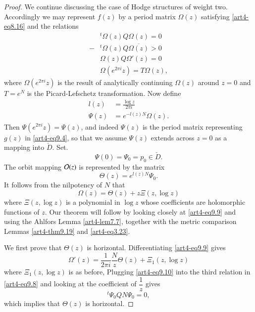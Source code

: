 \begin{proof}
We continue discussing the case of Hodge structures of weight two.  Accordingly we may represent $f(z)$ by a period matrix $\Omega(z)$ satisfying \eqref{art4-eq8.16} and the relations
\begin{align*}
&{}^t \Omega (z) Q \Omega (z) = 0\\
- & {}^t \Omega (z) Q \overline{\Omega(z)} > 0\\
&\Omega (z) Q \Omega' (z) =0\\
&\Omega (e^{2 \pi i} z) = T \Omega (z),
\end{align*}
where $\Omega (e^{2\pi i }z)$ is the result of analytically continuing $\Omega (z)$ around $z = 0$ and $T = e^N$ is the Picard-Lefschetz transformation. Now define
\begin{align*}
l (z) & = \frac{\log z}{2 \pi i}\\
\Psi (z) & = e^{-l (z) N } \Omega (z).
\end{align*}
Then $\Psi (e^{2 \pi i} z) = \Psi (z)$, and indeed $\Psi (z)$ is the period matrix representing $g(z)$ in \eqref{art4-eq9.4}, so that we assume $\Psi (z)$ extends across $z =0$ as a mapping into $\check{D}$. Set.
$$
\Psi (0) = \Psi_0 = p_0 \in \check{D}.
$$
The orbit mapping $\mathcal{O}(z)$ is represented by the matrix
$$
\Theta (z) = e^{l(z) N} \Psi_0.
$$
It follows from the nilpotency of $N$ that
\setcounter{equation}{8}
\begin{equation}
\Omega (z) = \Theta (z) + z \Xi (z, \log z) 
\label{art4-eq9.9}
\end{equation}
where $\Xi (z, \log z)$ is a polynomial in $\log z$ whose coefficients are holomorphic functions of $z$. Our theorem will follow by looking closely at \eqref{art4-eq9.9} and using the Ahlfors Lemma \eqref{art4-lem7.7}, together with the metric comparison Lemmas \eqref{art4-thm9.19} and \eqref{art4-eq3.23}.

We first prove that $\Theta (z)$ is horizontal. Differentiating \eqref{art4-eq9.9} gives
\begin{equation}
\Omega'(z) = \frac{1}{2 \pi i} \frac{N}{z} \Theta (z) + \Xi_1 (z, \log z) 
\label{art4-eq9.10}
\end{equation}\pageoriginale 
where $\Xi_1(z, \log z)$ is as before, Plugging \eqref{art4-eq9.10} into the third relation in \eqref{art4-eq9.8} and looking at the coefficient of $\dfrac{1}{z}$ gives
$$
{}^t \Psi_0 Q N \Psi_0 = 0,
$$
which implies that $\Theta (z)$ is horizontal.


\end{proof}
